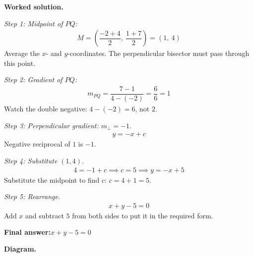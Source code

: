 \documentclass[11pt]{article}
\begin{document}
\textbf{Worked solution.}

\textit{Step 1: Midpoint of \( PQ \):}
\[\begin{gathered}
M = \left(\dfrac{-2+4}{2},\ \dfrac{1+7}{2}\right) = (1,\ 4)
\end{gathered}\]
Average the \( x \)- and \( y \)-coordinates. The perpendicular bisector must pass through this point.

\textit{Step 2: Gradient of \( PQ \):}
\[\begin{gathered}
m_{PQ} = \dfrac{7 - 1}{4 - (-2)} = \dfrac{6}{6} = 1
\end{gathered}\]
Watch the double negative: \( 4 - (-2) = 6 \), not \( 2 \).

\textit{Step 3: Perpendicular gradient: \( m_\perp = -1 \).}
\[\begin{gathered}
y = -x + c
\end{gathered}\]
Negative reciprocal of \( 1 \) is \( -1 \).

\textit{Step 4: Substitute \( (1, 4) \).}
\[\begin{gathered}
4 = -1 + c \implies c = 5 \implies y = -x + 5
\end{gathered}\]
Substitute the midpoint to find \( c \): \( c = 4 + 1 = 5 \).

\textit{Step 5: Rearrange.}
\[\begin{gathered}
x + y - 5 = 0
\end{gathered}\]
Add \( x \) and subtract \( 5 \) from both sides to put it in the required form.

\begin{answerbox}
\textbf{Final answer:}\quad \(\displaystyle x + y - 5 = 0\)
\end{answerbox}
\textbf{Diagram.}
\end{document}
